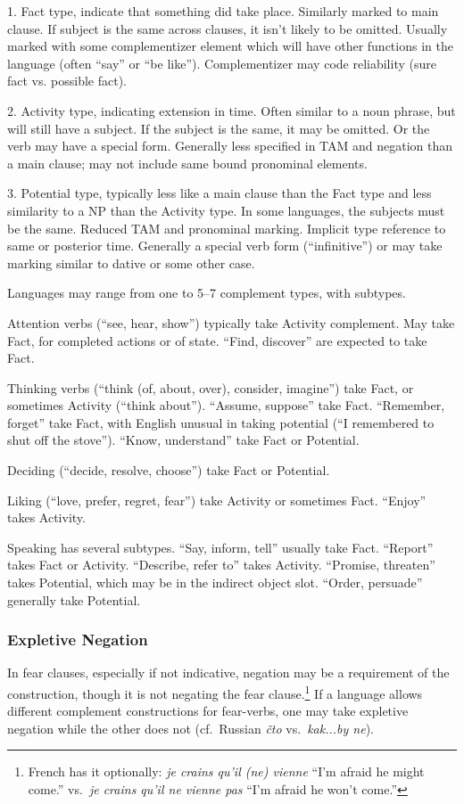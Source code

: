 \documentclass[11pt]{article}
\newcommand{\E}[1]{\textit{#1}}   %
\begin{document}
1.  Fact type, indicate that something did take place.  Similarly
marked to main clause.  If subject is the same across clauses, it
isn't likely to be omitted.  Usually marked with some complementizer
element which will have other functions in the language (often ``say''
or ``be like'').  Complementizer may code reliability (sure fact
vs. possible fact).

2. Activity type, indicating extension in time.  Often similar to a
noun phrase, but will still have a subject.  If the subject is the
same, it may be omitted.  Or the verb may have a special form.
Generally less specified in TAM and negation than a main clause; may
not include same bound pronominal elements.

3. Potential type, typically less like a main clause than the Fact
type and less similarity to a NP than the Activity type.  In some
languages, the subjects must be the same.  Reduced TAM and pronominal
marking.  Implicit type reference to same or posterior time.
Generally a special verb form (``infinitive'') or may take marking
similar to dative or some other case.

Languages may range from one to 5--7 complement types, with subtypes.

Attention verbs (``see, hear, show'') typically take Activity
complement.  May take Fact, for completed actions or of state.
``Find, discover'' are expected to take Fact.

Thinking verbs (``think (of, about, over), consider, imagine'') take
Fact, or sometimes Activity (``think about'').  ``Assume, suppose''
take Fact.  ``Remember, forget'' take Fact, with English unusual in
taking potential (``I remembered to shut off the stove'').  ``Know,
understand'' take Fact or Potential.

Deciding (``decide, resolve, choose'') take Fact or Potential.

Liking (``love, prefer, regret, fear'') take Activity or sometimes
Fact.  ``Enjoy'' takes Activity.

Speaking has several subtypes.  ``Say, inform, tell'' usually take
Fact.  ``Report'' takes Fact or Activity.  ``Describe, refer to''
takes Activity.  ``Promise, threaten'' takes Potential, which may be
in the indirect object slot.  ``Order, persuade'' generally take
Potential. 

\subsubsection{Expletive Negation}
In fear clauses, especially if not indicative, negation may be a
requirement of the construction, though it is not negating the fear
clause.\footnote{French has it optionally: \E{je crains qu'il (ne)
    vienne} ``I'm afraid he might come.'' vs.\ \E{je crains qu'il ne
    vienne pas} ``I'm afraid he won't come.''}  If a language allows
different complement constructions for fear-verbs, one may take
expletive negation while the other does not (cf.\ Russian \E{čto}
vs.\ \E{kak...by ne}).
\end{document}
